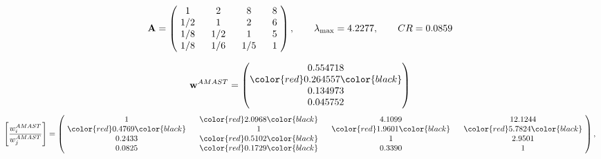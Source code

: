 \begin{example}
\begin{equation*}
\mathbf{A} =
\begin{pmatrix}
$\,\,$ 1 $\,\,$ & $\,\,$2$\,\,$ & $\,\,$8$\,\,$ & $\,\,$8 $\,\,$ \\
$\,\,$ 1/2$\,\,$ & $\,\,$ 1 $\,\,$ & $\,\,$2$\,\,$ & $\,\,$6 $\,\,$ \\
$\,\,$ 1/8$\,\,$ & $\,\,$ 1/2$\,\,$ & $\,\,$ 1 $\,\,$ & $\,\,$5 $\,\,$ \\
$\,\,$ 1/8$\,\,$ & $\,\,$ 1/6$\,\,$ & $\,\,$ 1/5$\,\,$ & $\,\,$ 1  $\,\,$ \\
\end{pmatrix},
\qquad
\lambda_{\max} =
4.2277,
\qquad
CR = 0.0859
\end{equation*}

\begin{equation*}
\mathbf{w}^{AMAST} =
\begin{pmatrix}
0.554718\\
\color{red} 0.264557\color{black} \\
0.134973\\
0.045752
\end{pmatrix}\end{equation*}
\begin{equation*}
\left[ \frac{{w}^{AMAST}_i}{{w}^{AMAST}_j} \right] =
\begin{pmatrix}
$\,\,$ 1 $\,\,$ & $\,\,$\color{red} 2.0968\color{black} $\,\,$ & $\,\,$4.1099$\,\,$ & $\,\,$12.1244$\,\,$ \\
$\,\,$\color{red} 0.4769\color{black} $\,\,$ & $\,\,$ 1 $\,\,$ & $\,\,$\color{red} 1.9601\color{black} $\,\,$ & $\,\,$\color{red} 5.7824\color{black}   $\,\,$ \\
$\,\,$0.2433$\,\,$ & $\,\,$\color{red} 0.5102\color{black} $\,\,$ & $\,\,$ 1 $\,\,$ & $\,\,$2.9501 $\,\,$ \\
$\,\,$0.0825$\,\,$ & $\,\,$\color{red} 0.1729\color{black} $\,\,$ & $\,\,$0.3390$\,\,$ & $\,\,$ 1  $\,\,$ \\
\end{pmatrix},
\end{equation*}


\end{example}

